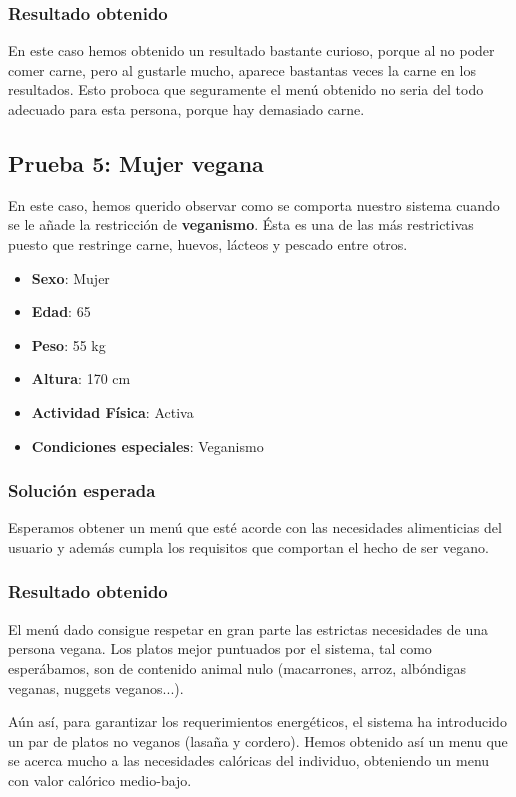 \documentclass[11]{article}
\begin{document}
\subsubsection{Resultado obtenido}

En este caso hemos obtenido un resultado bastante curioso, porque al no poder comer carne, pero al gustarle mucho, aparece bastantas veces la carne en los resultados. Esto proboca que seguramente el menú obtenido no seria del todo adecuado para esta persona, porque hay demasiado carne.

\subsection{Prueba 5: Mujer vegana}
En este caso, hemos querido observar como se comporta nuestro sistema cuando se le añade la restricción de \textbf{veganismo}. Ésta es una de las más restrictivas puesto que restringe carne, huevos, lácteos y pescado entre otros. 

\begin{itemize}
\item \textbf{Sexo}: Mujer
\item \textbf{Edad}: 65
\item \textbf{Peso}: 55 kg
\item \textbf{Altura}: 170 cm
\item \textbf{Actividad Física}: Activa
\item \textbf{Condiciones especiales}: Veganismo
\end{itemize}

\subsubsection{Solución esperada}
Esperamos obtener un menú que esté acorde con las necesidades alimenticias del usuario y además cumpla los requisitos que comportan el hecho de ser vegano.

\subsubsection{Resultado obtenido}

El menú dado consigue respetar en gran parte las estrictas necesidades de una persona vegana.
Los platos mejor puntuados por el sistema, tal como esperábamos, son de contenido animal nulo (macarrones, arroz, albóndigas veganas, nuggets veganos...).

Aún así, para garantizar los requerimientos energéticos, el sistema ha introducido un par de platos no veganos (lasaña y cordero).
Hemos obtenido así un menu que se acerca mucho a las necesidades calóricas del individuo, obteniendo un menu con valor calórico medio-bajo.
\end{document}
